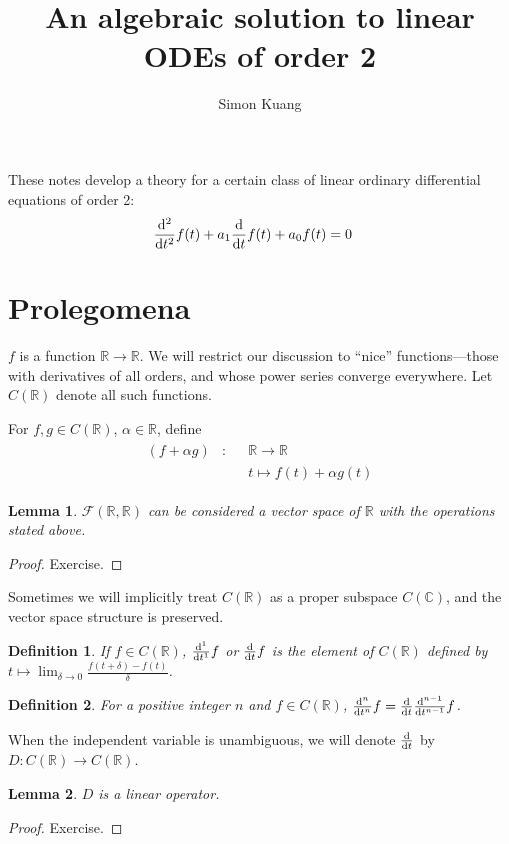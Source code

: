 \documentclass[oneside]{memoir}
\newtheorem{definition}{Definition}
\newtheorem{lemma}{Lemma}
\begin{document}
	\title{An algebraic solution to linear ODEs of order 2}
	\author{Simon Kuang}
	\maketitle
	These notes develop a theory for a certain class of linear ordinary differential equations of order 2:
	\begin{align*}
		\derivative[2]{}{t} f(t) + a_1\derivative{}{t} f(t) + a_0 f(t) &= 0
	\end{align*}
	
	\section{Prolegomena}
	\def\realfunctions{\ensuremath{C(\mathbb{R})}}
	\(f\) is a function \(\mathbb{R}\to \mathbb{R}\).
	We will restrict our discussion to ``nice'' functions---those with derivatives of all orders, and whose power series converge everywhere.
	Let \(\realfunctions\) denote all such functions.
	
	For \(f, g \in \realfunctions\), \(\alpha \in \mathbb{R}\), define
	\begin{align*}
		\begin{aligned}
			\left(f + \alpha g\right) &: &&\mathbb{R} \to \mathbb{R} \\
									  &\phantom{{}:{}} && t \mapsto f(t) + \alpha g(t)
		\end{aligned}
	\end{align*}
	
	\begin{lemma}
		\(\mathcal{F}(\mathbb{R}, \mathbb{R})\) can be considered a vector space of \(\mathbb{R}\) with the operations stated above.
	\end{lemma}
	\begin{proof}
		Exercise.
	\end{proof}
	
	Sometimes we will implicitly treat \(\realfunctions\) as a proper subspace \(C(\mathbb{C})\), and the vector space structure is preserved.
	
	\begin{definition}
		If \(f\in \realfunctions\), \(\derivative[1]{}{t}f\) or \(\derivative{}{t}f\) is the element of \(\realfunctions\) defined by \(t \mapsto \lim_{\delta\to 0}\frac{f(t + \delta) - f(t)}{\delta}\).
	\end{definition}
	\begin{definition}
		For a positive integer \(n\) and \(f\in\realfunctions\), \(\derivative[n]{}{t} f = \derivative{}{t} \derivative[n - 1]{}{t} f\).
	\end{definition}
	When the independent variable is unambiguous, we will denote \(\derivative{}{t}\) by \(D:\realfunctions\to\realfunctions\).
	\begin{lemma}
		\(D\) is a linear operator.
	\end{lemma}
	\begin{proof}
		Exercise.
	\end{proof}
	
\end{document}

